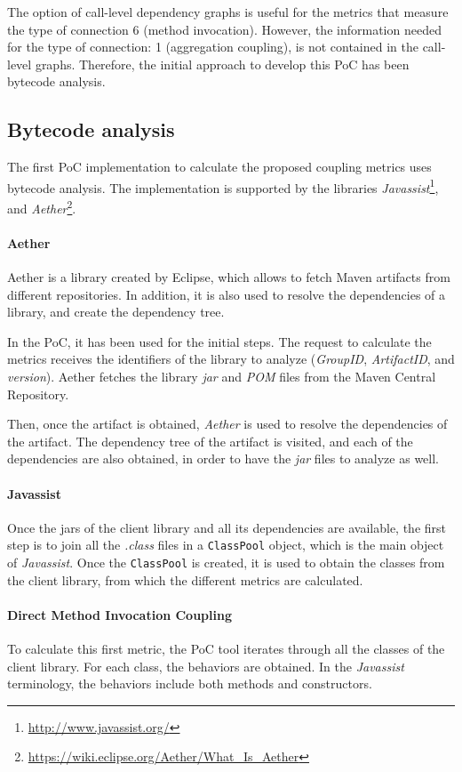 The option of call-level dependency graphs is useful for the metrics that measure the type of connection 6 (method invocation). However, the information needed for the type of connection: 1 (aggregation coupling), is not contained in the call-level graphs. Therefore, the initial approach to develop this PoC has been bytecode analysis.

\subsection{Bytecode analysis}
The first PoC implementation to calculate the proposed coupling metrics uses bytecode analysis. The implementation is supported by the libraries \textit{Javassist}\footnote{\url{http://www.javassist.org/}}, and \textit{Aether}\footnote{\url{https://wiki.eclipse.org/Aether/What_Is_Aether}}.

\paragraph{Aether}
Aether is a library created by Eclipse, which allows to fetch Maven artifacts from different repositories. In addition, it is also used to resolve the dependencies of a library, and create the dependency tree.

In the PoC, it has been used for the initial steps. The request to calculate the metrics receives the identifiers of the library to analyze (\textit{GroupID}, \textit{ArtifactID}, and \textit{version}). Aether fetches the library \textit{jar} and \textit{POM} files from the Maven Central Repository.

Then, once the artifact is obtained, \textit{Aether} is used to resolve the dependencies of the artifact. The dependency tree of the artifact is visited, and each of the dependencies are also obtained, in order to have the \textit{jar} files to analyze as well.

\paragraph{Javassist}
Once the jars of the client library and all its dependencies are available, the first step is to join all the \textit{.class} files in a \texttt{ClassPool} object, which is the main object of \textit{Javassist}. Once the \texttt{ClassPool} is created, it is used to obtain the classes from the client library, from which the different metrics are calculated.

\paragraph{Direct Method Invocation Coupling}
To calculate this first metric, the PoC tool iterates through all the classes of the client library. For each class, the behaviors are obtained. In the \textit{Javassist} terminology, the behaviors include both methods and constructors.

